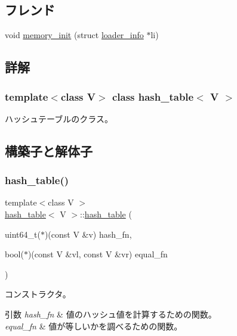 \subsection*{フレンド}
\begin{DoxyCompactItemize}
\item 
void \hyperlink{classhash__table_a8840f01b46a3b9c43a461591a579c1bd}{memory\+\_\+init} (struct \hyperlink{structloader__info}{loader\+\_\+info} $\ast$li)
\end{DoxyCompactItemize}


\subsection{詳解}
\subsubsection*{template$<$class V$>$\newline
class hash\+\_\+table$<$ V $>$}

ハッシュテーブルのクラス。 

\subsection{構築子と解体子}
\hypertarget{classhash__table_a5e4a74748ecad78e798739a03be056cb}{}\label{classhash__table_a5e4a74748ecad78e798739a03be056cb} 
\subsubsection{\texorpdfstring{hash\+\_\+table()}{hash\_table()}\hspace{0.1cm}{\footnotesize\ttfamily [1/4]}}
{\footnotesize\ttfamily template$<$class V $>$ \\
\hyperlink{classhash__table}{hash\+\_\+table}$<$ V $>$\+::\hyperlink{classhash__table}{hash\+\_\+table} (\begin{DoxyParamCaption}\item[{uint64\+\_\+t($\ast$)(const V \&v)}]{hash\+\_\+fn,  }\item[{bool($\ast$)(const V \&vl, const V \&vr)}]{equal\+\_\+fn }\end{DoxyParamCaption})}

コンストラクタ。 
\begin{DoxyParams}{引数}
{\em hash\+\_\+fn} & 値のハッシュ値を計算するための関数。 \\
\hline
{\em equal\+\_\+fn} & 値が等しいかを調べるための関数。 \\
\hline
\end{DoxyParams}
\hypertarget{classhash__table_aa71d6ba6b69c0cc05713feeb39b25a30}{}\label{classhash__table_aa71d6ba6b69c0cc05713feeb39b25a30} 
